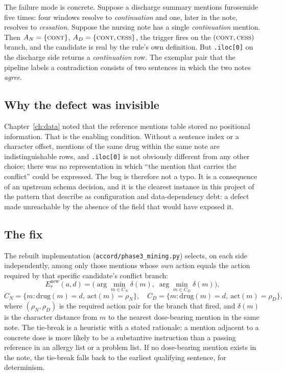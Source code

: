The failure mode is concrete. Suppose a discharge summary mentions furosemide
five times: four windows resolve to \emph{continuation} and one, later in the
note, resolves to \emph{cessation}. Suppose the nursing note has a single
\emph{continuation} mention. Then $A_N = \{\textsc{cont}\}$,
$A_D = \{\textsc{cont}, \textsc{cess}\}$, the trigger fires on the
$(\textsc{cont}, \textsc{cess})$ branch, and the candidate is real by the rule's
own definition. But \texttt{.iloc[0]} on the discharge side returns a
\emph{continuation} row. The exemplar pair that the pipeline labels a
contradiction consists of two sentences in which the two notes \emph{agree}.

\subsection{Why the defect was invisible}

Chapter~\ref{ch:data} noted that the reference mentions table stored no
positional information. That is the enabling condition. Without a sentence index
or a character offset, mentions of the same drug within the same note are
indistinguishable rows, and \texttt{.iloc[0]} is not obviously different from any
other choice; there was no representation in which ``the mention that carries
the conflict'' could be expressed. The bug is therefore not a typo. It is a
consequence of an upstream schema decision, and it is the clearest instance in
this project of the pattern that \citet{sculley2015debt} describe as
configuration and data-dependency debt: a defect made unreachable by the absence
of the field that would have exposed it.

\subsection{The fix}

The rebuilt implementation (\texttt{accord/phase3\_mining.py}) selects, on each
side independently, among only those mentions whose \emph{own} action equals the
action required by that specific candidate's conflict branch:
\[
E_r^{\text{new}}(a,d) = \bigl(\arg\!\min_{m \in C_N} \delta(m),\;
\arg\!\min_{m \in C_D} \delta(m)\bigr),
\]
\[
C_N = \{m : \mathrm{drug}(m)=d,\ \mathrm{act}(m) = \rho_N\}, \quad
C_D = \{m : \mathrm{drug}(m)=d,\ \mathrm{act}(m) = \rho_D\},
\]
where $(\rho_N, \rho_D)$ is the required action pair for the branch that fired,
and $\delta(m)$ is the character distance from $m$ to the nearest dose-bearing
mention in the same note. The tie-break is a heuristic with a stated rationale:
a mention adjacent to a concrete dose is more likely to be a substantive
instruction than a passing reference in an allergy list or a problem list. If no
dose-bearing mention exists in the note, the tie-break falls back to the
earliest qualifying sentence, for determinism.

